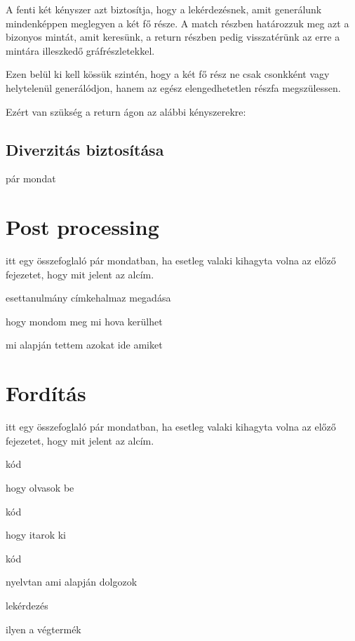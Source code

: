 A fenti két kényszer azt biztosítja, hogy a lekérdezésnek, amit generálunk mindenképpen meglegyen a két fő része. A match részben határozzuk meg azt a bizonyos mintát, amit keresünk, a return részben pedig visszatérünk az erre a mintára illeszkedő gráfrészletekkel.

Ezen belül ki kell kössük szintén, hogy a két fő rész ne csak csonkként vagy helytelenül generálódjon, hanem az egész elengedhetetlen részfa megszülessen.

Ezért van szükség a return ágon az alábbi kényszerekre:



\subsection{Diverzitás biztosítása}
pár mondat




\section{Post processing}
itt egy összefoglaló pár mondatban, ha esetleg valaki kihagyta volna az előző fejezetet, hogy mit jelent az alcím.

esettanulmány címkehalmaz megadása 

hogy mondom meg mi hova kerülhet

mi alapján tettem azokat ide amiket


\section{Fordítás}
itt egy összefoglaló pár mondatban, ha esetleg valaki kihagyta volna az előző fejezetet, hogy mit jelent az alcím.

kód

hogy olvasok be

kód

hogy itarok ki

kód

nyelvtan ami alapján dolgozok

lekérdezés

ilyen a végtermék

